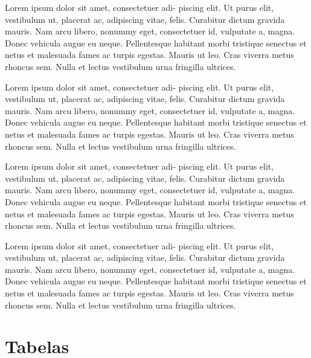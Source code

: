 \begin{question}[type={exam}]{2}
Lorem ipsum dolor sit amet, consectetuer adi-
piscing elit. Ut purus elit, vestibulum ut, placerat ac, adipiscing vitae,
felis. Curabitur dictum gravida mauris. Nam arcu libero, nonummy
eget, consectetuer id, vulputate a, magna. Donec vehicula augue
eu neque. Pellentesque habitant morbi tristique senectus et netus
et malesuada fames ac turpis egestas. Mauris ut leo. Cras viverra
metus rhoncus sem. Nulla et lectus vestibulum urna fringilla ultrices.
\end{question}

\begin{question}[type={exam}]{2}
Lorem ipsum dolor sit amet, consectetuer adi-
piscing elit. Ut purus elit, vestibulum ut, placerat ac, adipiscing vitae,
felis. Curabitur dictum gravida mauris. Nam arcu libero, nonummy
eget, consectetuer id, vulputate a, magna. Donec vehicula augue
eu neque. Pellentesque habitant morbi tristique senectus et netus
et malesuada fames ac turpis egestas. Mauris ut leo. Cras viverra
metus rhoncus sem. Nulla et lectus vestibulum urna fringilla ultrices.
\end{question}

\begin{question}[type={exam}]{2}
Lorem ipsum dolor sit amet, consectetuer adi-
piscing elit. Ut purus elit, vestibulum ut, placerat ac, adipiscing vitae,
felis. Curabitur dictum gravida mauris. Nam arcu libero, nonummy
eget, consectetuer id, vulputate a, magna. Donec vehicula augue
eu neque. Pellentesque habitant morbi tristique senectus et netus
et malesuada fames ac turpis egestas. Mauris ut leo. Cras viverra
metus rhoncus sem. Nulla et lectus vestibulum urna fringilla ultrices.
\end{question}

\begin{question}[type={exam}]{2}
Lorem ipsum dolor sit amet, consectetuer adi-
piscing elit. Ut purus elit, vestibulum ut, placerat ac, adipiscing vitae,
felis. Curabitur dictum gravida mauris. Nam arcu libero, nonummy
eget, consectetuer id, vulputate a, magna. Donec vehicula augue
eu neque. Pellentesque habitant morbi tristique senectus et netus
et malesuada fames ac turpis egestas. Mauris ut leo. Cras viverra
metus rhoncus sem. Nulla et lectus vestibulum urna fringilla ultrices.
\end{question}
\vfill
\pagebreak
\section{Tabelas}


